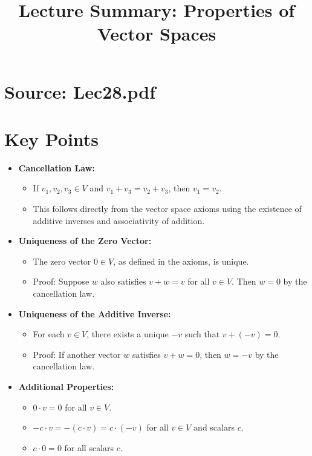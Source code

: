 \documentclass{article}
\title{Lecture Summary: Properties of Vector Spaces}
\author{}
\date{}
\begin{document}
\maketitle

\section*{Source: Lec28.pdf}

\section*{Key Points}

\begin{itemize}
  \item \textbf{Cancellation Law:}
    \begin{itemize}
      \item If $v_1, v_2, v_3 \in V$ and $v_1 + v_3 = v_2 + v_3$, then $v_1 = v_2$.
      \item This follows directly from the vector space axioms using the existence of additive inverses and associativity of addition.
    \end{itemize}

  \item \textbf{Uniqueness of the Zero Vector:}
    \begin{itemize}
      \item The zero vector $0 \in V$, as defined in the axioms, is unique.
      \item Proof: Suppose $w$ also satisfies $v + w = v$ for all $v \in V$. Then $w = 0$ by the cancellation law.
    \end{itemize}

  \item \textbf{Uniqueness of the Additive Inverse:}
    \begin{itemize}
      \item For each $v \in V$, there exists a unique $-v$ such that $v + (-v) = 0$.
      \item Proof: If another vector $w$ satisfies $v + w = 0$, then $w = -v$ by the cancellation law.
    \end{itemize}

  \item \textbf{Additional Properties:}
    \begin{itemize}
      \item $0 \cdot v = 0$ for all $v \in V$.
      \item $-c \cdot v = -(c \cdot v) = c \cdot (-v)$ for all $v \in V$ and scalars $c$.
      \item $c \cdot 0 = 0$ for all scalars $c$.
    \end{itemize}


\end{itemize}
\end{document}

